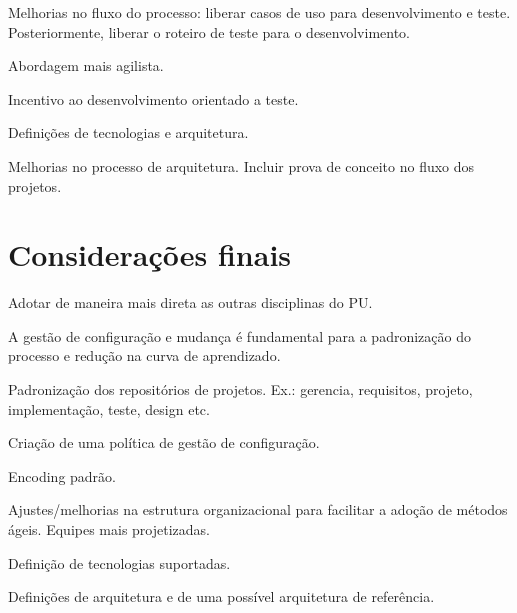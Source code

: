 \documentclass[
	article,			%
	11pt,				%
	oneside,			%
	a4paper,			%
	english,			%
	brazil,				%
	sumario=tradicional
	]{abntex2}
\begin{document}
Melhorias no fluxo do processo: liberar casos de uso para desenvolvimento e
teste. Posteriormente, liberar o roteiro de teste para o desenvolvimento.

Abordagem mais agilista.

Incentivo ao desenvolvimento  orientado a teste.

Definições de tecnologias e arquitetura.

Melhorias no processo de arquitetura. Incluir prova de conceito no fluxo dos
projetos.

% 

\section*{Considerações finais}

Adotar de maneira mais direta as outras disciplinas do PU.

A gestão de configuração e mudança é fundamental para a padronização do processo
e redução na curva de aprendizado.

Padronização dos repositórios de projetos. Ex.: gerencia, requisitos, projeto,
implementação, teste, design etc.

Criação de uma política de gestão de configuração.

Encoding padrão.

Ajustes/melhorias na estrutura organizacional para facilitar a adoção de
métodos ágeis. Equipes mais projetizadas.

Definição de tecnologias suportadas.

Definições de arquitetura e de uma possível arquitetura de referência.

\postextual


\end{document}
